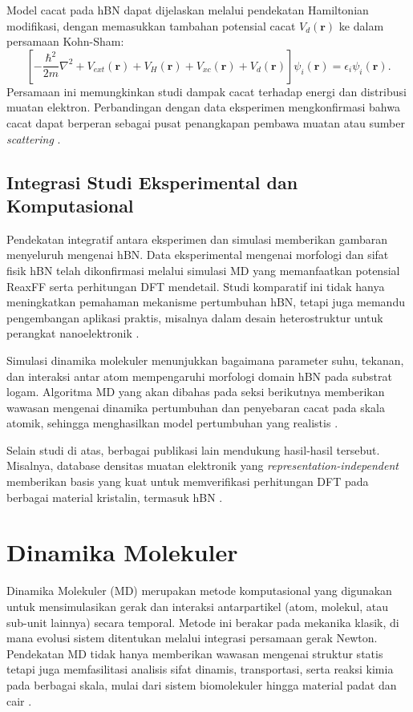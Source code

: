 Model cacat pada hBN dapat dijelaskan melalui pendekatan Hamiltonian modifikasi, dengan memasukkan tambahan potensial cacat \(V_d(\mathbf{r})\) ke dalam persamaan Kohn-Sham:
\begin{equation}
    \left[-\frac{\hbar^2}{2m}\nabla^2 + V_{ext}(\mathbf{r}) + V_H(\mathbf{r}) + V_{xc}(\mathbf{r}) + V_d(\mathbf{r})\right]\psi_i(\mathbf{r}) = \epsilon_i \psi_i(\mathbf{r}).
\end{equation}
Persamaan ini memungkinkan studi dampak cacat terhadap energi dan distribusi muatan elektron. Perbandingan dengan data eksperimen mengkonfirmasi bahwa cacat dapat berperan sebagai pusat penangkapan pembawa muatan atau sumber \emph{scattering} \citep{garcia_defect_2015}.

\subsection{Integrasi Studi Eksperimental dan Komputasional}
Pendekatan integratif antara eksperimen dan simulasi memberikan gambaran menyeluruh mengenai hBN. Data eksperimental mengenai morfologi dan sifat fisik hBN telah dikonfirmasi melalui simulasi MD yang memanfaatkan potensial ReaxFF serta perhitungan DFT mendetail. Studi komparatif ini tidak hanya meningkatkan pemahaman mekanisme pertumbuhan hBN, tetapi juga memandu pengembangan aplikasi praktis, misalnya dalam desain heterostruktur untuk perangkat nanoelektronik \citep{wang_predicting_2018}.

Simulasi dinamika molekuler menunjukkan bagaimana parameter suhu, tekanan, dan interaksi antar atom mempengaruhi morfologi domain hBN pada substrat logam. Algoritma MD yang akan dibahas pada seksi berikutnya memberikan wawasan mengenai dinamika pertumbuhan dan penyebaran cacat pada skala atomik, sehingga menghasilkan model pertumbuhan yang realistis \citep{wang_predicting_2018}.
  
Selain studi di atas, berbagai publikasi lain mendukung hasil-hasil tersebut. Misalnya, database densitas muatan elektronik yang \emph{representation-independent} memberikan basis yang kuat untuk memverifikasi perhitungan DFT pada berbagai material kristalin, termasuk hBN \citep{smith_representation-independent_2020}.

\section{Dinamika Molekuler}
Dinamika Molekuler (MD) merupakan metode komputasional yang digunakan untuk mensimulasikan gerak dan interaksi antarpartikel (atom, molekul, atau sub-unit lainnya) secara temporal. Metode ini berakar pada mekanika klasik, di mana evolusi sistem ditentukan melalui integrasi persamaan gerak Newton. Pendekatan MD tidak hanya memberikan wawasan mengenai struktur statis tetapi juga memfasilitasi analisis sifat dinamis, transportasi, serta reaksi kimia pada berbagai skala, mulai dari sistem biomolekuler hingga material padat dan cair \citep{allen_computer_1989,frenkel_understanding_2002}.


